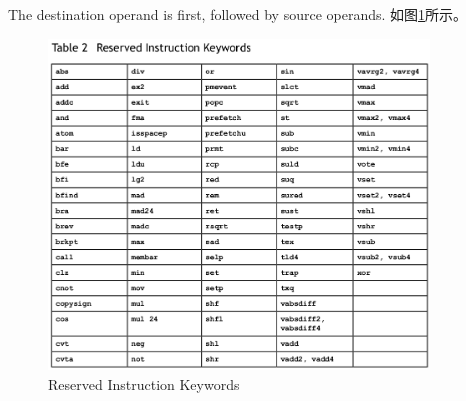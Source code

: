 \begin{itemize}
The destination operand is first, followed by source operands.
如图\ref{ReservedInstructionKeywords}所示。
\begin{figure}[!hbtp]
\centering
\includegraphics[width=0.9\textwidth]{CUDAImageProcessing/ReservedInstructionKeywords}
\caption{Reserved Instruction Keywords}
\label{ReservedInstructionKeywords}
\end{figure}


\end{itemize}


